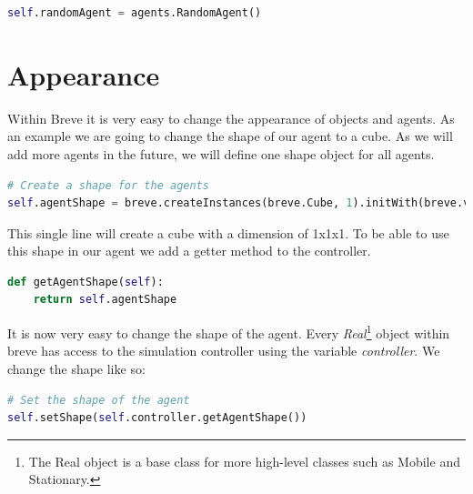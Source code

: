 
\begin{lstlisting}[language=Python]
self.randomAgent = agents.RandomAgent()
\end{lstlisting}

\section{Appearance}

Within Breve it is very easy to change the appearance of objects and agents. As an example we are going to change the shape of our agent to a cube. As we will add more agents in the future, we will define one shape object for all agents.

\begin{fullwidth}
\begin{lstlisting}[language=Python]
# Create a shape for the agents
self.agentShape = breve.createInstances(breve.Cube, 1).initWith(breve.vector(1,1,1))
\end{lstlisting}
\end{fullwidth}

This single line will create a cube with a dimension of 1x1x1. To be able to use this shape in our agent we add a getter method to the controller.

\begin{lstlisting}[language=Python]
def getAgentShape(self):
	return self.agentShape
\end{lstlisting}

It is now very easy to change the shape of the agent. Every \textit{Real}\footnote{The Real object is a base class for more high-level classes such as Mobile and Stationary.} object within breve has access to the simulation controller using the variable \textit{controller}. We change the shape like so:

\begin{lstlisting}[language=Python]
# Set the shape of the agent
self.setShape(self.controller.getAgentShape())
\end{lstlisting}


